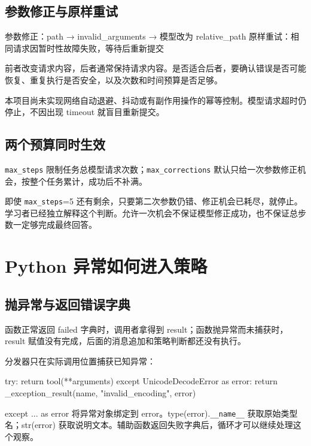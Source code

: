 \subsection{参数修正与原样重试}

\begin{Code}
参数修正：path → invalid_arguments → 模型改为 relative_path
原样重试：相同请求因暂时性故障失败，等待后重新提交
\end{Code}

前者改变请求内容，后者通常保持请求内容。是否适合后者，要确认错误是否可能恢复、重复执行是否安全，以及次数和时间预算是否足够。

本项目尚未实现网络自动退避、抖动或有副作用操作的幂等控制。模型请求超时仍停止，不因出现 timeout 就盲目重新提交。

\subsection{两个预算同时生效}

\nolinkurl{max_steps} 限制任务总模型请求次数；\nolinkurl{max_corrections} 默认只给一次参数修正机会，按整个任务累计，成功后不补满。

即使 \nolinkurl{max_steps}=5 还有剩余，只要第二次参数仍错、修正机会已耗尽，就停止。学习者已经独立解释这个判断。允许一次机会不保证模型修正成功，也不保证总步数一定够完成最终回答。

\section{Python 异常如何进入策略}

\subsection{抛异常与返回错误字典}

函数正常返回 failed 字典时，调用者拿得到 result；函数抛异常而未捕获时，result 赋值没有完成，后面的消息追加和策略判断都还没有执行。

分发器只在实际调用位置捕获已知异常：

\begin{Code}
try:
    return tool(**arguments)
except UnicodeDecodeError as error:
    return _exception_result(name, "invalid_encoding", error)
\end{Code}

except ... as error 将异常对象绑定到 error。type(error).\nolinkurl{__name__} 获取原始类型名；str(error) 获取说明文本。辅助函数返回失败字典后，循环才可以继续处理这个观察。

